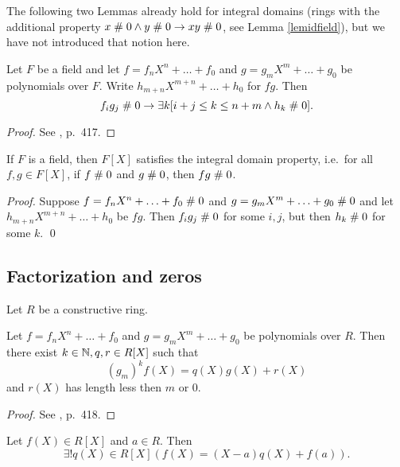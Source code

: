 The following two Lemmas already hold for integral domains (rings with the
additional property $x\mathrel{\#} 0 \wedge y\mathrel{\#} 0 \rightarrow xy \mathrel{\#} 0$,
see Lemma \ref{lemidfield}), but we have not introduced that notion here.

\begin{lemma}\label{lempolid}
  Let $F$ be a field and let $f = f_n X^n + \ldots + f_0$
  and $g= g_m X^m  + \ldots + g_0$ be polynomials over $F$. Write
  $h_{m+n} X^{m+n}  + \ldots + h_0$ for $fg$. Then
$$f_i g_j \mathrel{\#} 0 \rightarrow \exists k[ i+j \leq k \leq n+m \wedge h_k
\mathrel{\#} 0].$$
\end{lemma}

\begin{proof}
  See \cite{TvD882}, p.\ 417.
\end{proof}

\begin{theorem}\label{thmpolid}
  If $F$ is a field, then $F[X]$ satisfies the integral domain
  property, i.e.\ for all $f, g \in F[X]$, if $f\mathrel{\#} 0$ and $g\mathrel{\#}
  0$, then $fg\mathrel{\#} 0$.
\end{theorem}

\begin{proof}
  Suppose $f= f_n X^n + \ldots + f_0 \mathrel{\#} 0$ and $g= g_m X^m  +
  \ldots + g_0\mathrel{\#} 0$ and let $h_{m+n} X^{m+n}  + \ldots + h_0$ be
  $fg$. Then $f_i g_j \mathrel{\#} 0$ for some 
  $i,j$, but then $h_k\mathrel{\#} 0$ for some $k$. \qed
\end{proof}

\subsection{Factorization and zeros}
Let $R$ be a constructive ring.

\begin{lemma}\label{lemremainder}
  Let $f = f_n X^n + \ldots + f_0$
  and $g= g_m X^m  + \ldots + g_0$ be polynomials over $R$. Then there
  exist $k\in \mathbb{N}, q,r \in R[X]$ such that
$$(g_m)^k f(X) = q(X) g(X) + r(X)$$
  and $r(X)$ has length less then $m$ or $0$.
\end{lemma}

\begin{proof}
  See \cite{TvD882}, p.\ 418.
\end{proof}

\begin{theorem}\label{thmremainder}
  Let $f(X)\in R[X]$ and $a\in R$. Then
$$\exists ! q(X)\in R[X] ( f(X) = (X-a) q(X) + f(a)).$$
\end{theorem}

